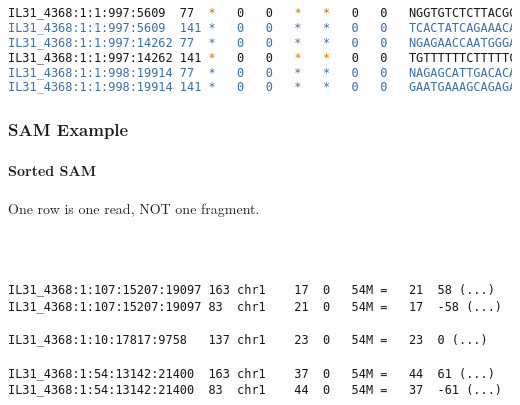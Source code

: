 \documentclass[xcolor=table]{beamer}
\begin{document}
\begin{frame}[fragile]
\begin{framed}
\begin{lstlisting}[language=bash,basicstyle=\tiny]
IL31_4368:1:1:997:5609	77	*	0	0	*	*	0	0	NGGTGTCTCTTACGGACAGCATTAAGCTAGATTCTTTTTAGACCGATCTGCCAA	(*+*&,1426<;@@??@>?9@@@<@4>>?>666260.)-*9;;;8>:>'0<418
IL31_4368:1:1:997:5609	141	*	0	0	*	*	0	0	TCACTATCAGAAACAGAATGTATAACTTCCAAATCAGTAGGAAACACAAGGAAA	AEECECBEC@A;AC=<AEEEEAEEEE>AC,CE?ECCE9EAEC4E:<C>AC@EE)
IL31_4368:1:1:997:14262	77	*	0	0	*	*	0	0	NGAGAACCAATGGGAAGCAGCCTGAGCTGCTGGAACCTATTCCCCATGACTTCA	(9136242-2@@@;96.>>>@@@@>0$<><>>2623.':**+3*03137..--.
IL31_4368:1:1:997:14262	141	*	0	0	*	*	0	0	TGTTTTTTCTTTTTCTTTTTTTTTTGACAGTGCAGAGATTTTTTATCTTTTTAA	97'<2<.64.?7/3(891?=(6??6+<6<++/*..3(:'/'9::''&(1<>.(,
IL31_4368:1:1:998:19914	77	*	0	0	*	*	0	0	NAGAGCATTGACACACATAAAAAATTAAAACAACCCTTTGTACTTACGGTAGAA	(/892<<>55@>>?<><<<7..())@@@;<<<22>65267<<@@<8>>..3;/$
IL31_4368:1:1:998:19914	141	*	0	0	*	*	0	0	GAATGAAAGCAGAGACCCTGATCGAGCCCCAGAAAGATACACCTCCAGATTTTA	C?=CECE4CD<?8@==;EBE<=0@:@@92@???6<991>.<?A=@5?@99;971
\end{lstlisting}
\end{framed}
\end{frame}


\begin{frame}[fragile]
\frametitle{SAM Example}
\framesubtitle{Sorted SAM}
One row is one read, NOT one fragment.
\begin{framed}\tiny
\begin{verbatim}



IL31_4368:1:107:15207:19097	163	chr1	17	0	54M	=	21	58 (...)
IL31_4368:1:107:15207:19097	83	chr1	21	0	54M	=	17	-58 (...)

IL31_4368:1:10:17817:9758	137	chr1	23	0	54M	=	23	0 (...)

IL31_4368:1:54:13142:21400	163	chr1	37	0	54M	=	44	61 (...)
IL31_4368:1:54:13142:21400	83	chr1	44	0	54M	=	37	-61 (...)


\end{verbatim}
\end{framed}
\end{frame}
\end{document}
